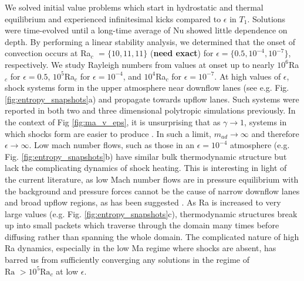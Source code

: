 \documentclass[aps, prl, twocolumn, groupedaddress, amsfonts, amssymb, amsmath]{revtex4-1}
\begin{document}
We solved initial value problems which start in hydrostatic and thermal equilibrium and experienced infinitesimal 
kicks compared to $\epsilon$ in $T_1$.  Solutions were time-evolved until a long-time average of Nu showed little
dependence on depth. By performing a linear stability analysis, we determined that the onset of convection
occurs at Ra$_c$ $= \{10, 11, 11\}$ (\textbf{need exact}) for $\epsilon = \{0.5, 10^{-4}, 10^{-7}\}$, respectively.  We study Rayleigh
numbers from values at onset up to nearly $10^6$Ra$_c$ for $\epsilon = 0.5$, $10^5$Ra$_c$ for $\epsilon = 10^{-4}$,
and $10^4$Ra$_c$ for $\epsilon = 10^{-7}$.  At
high values of $\epsilon$, shock systems form in the upper atmosphere near downflow lanes 
(see e.g. Fig. \ref{fig:entropy_snapshots}a) and propagate towards upflow lanes.  Such systems were reported in
both two \cite{cattaneo&all1990} and three \cite{malagoli&all1990} dimensional polytropic simulations previously.
In the context of Fig \ref{fig:ma_v_eps}, it is unsurprising that as $\gamma \rightarrow 1$, systems in which shocks
form are easier to produce \cite{cattaneo&all1990}.  In such a limit, $m_{ad} \rightarrow \infty$ 
and therefore $\epsilon \rightarrow \infty$.
Low mach number flows, such as those in an $\epsilon = 10^{-4}$ atmosphere (e.g. Fig. \ref{fig:entropy_snapshots}b)
have similar bulk thermodynamic structure but lack the complicating dynamics of shock heating. This is interesting
in light of the current literature, as low Mach number flows are in pressure equilibrium with the background and
pressure forces cannot be the cause of narrow downflow lanes and broad upflow regions, as has been suggested
\cite{hurlburt&all1984}.  As Ra is
increased to very large values (e.g. Fig. \ref{fig:entropy_snapshots}c), thermodynamic structures 
break up into small packets which traverse through the domain many
times before diffusing rather than spanning the whole domain.  
The complicated nature of high Ra dynamics, especially in the low Ma regime where
shocks are absent, has barred us from sufficiently converging any solutions in the regime of 
$\text{Ra }> 10^5\text{Ra}_c$ at low $\epsilon$.
\end{document}
